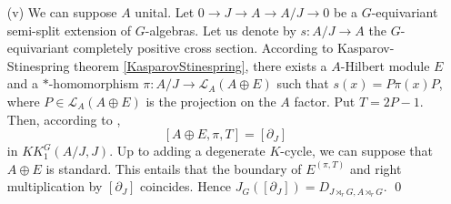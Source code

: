 \begin{dem}
\begin{enumerate}
\item[(v)] We can suppose $A$ unital. Let $0 \rightarrow J \rightarrow A \rightarrow A /J \rightarrow 0$ be a $G$-equivariant semi-split extension of $G$-algebras. Let us denote by $s : A/J \rightarrow A $ the $G$-equivariant completely positive cross section.  According to Kasparov-Stinespring theorem \ref{KasparovStinespring}, there exists a $A$-Hilbert module $E$ and a $*$-homomorphism $\pi : A/J \rightarrow \mathcal L_{A}(A\oplus E)$ such that $s(x) = P \pi(x) P$, where $P \in \mathcal L_{A}(A\oplus E)$ is the projection on the $A$ factor. Put $T= 2P-1$. Then, according to \cite{SkandalisExtension}, 
\[[A\oplus E, \pi , T] = [\partial_J]\]
in $KK_1^G(A/J,J)$. Up to adding a degenerate $K$-cycle, we can suppose that $A\oplus E$ is standard. This entails that the boundary of $E^{(\pi,T)}$ and right multiplication by $[\partial_J]$ coincides. Hence $J_G([\partial_J]) = D_{J\rtimes_r G,A\rtimes_r G}$.
\qed
\end{enumerate}
\end{dem}

